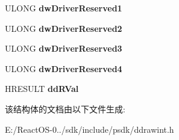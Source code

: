 \begin{DoxyCompactItemize}
\mbox{\label{struct___d_d___s_y_n_c_s_u_r_f_a_c_e_d_a_t_a_ab414a448f28bf179a7cd7fc4d0237489}} 
U\+L\+O\+NG {\bfseries dw\+Driver\+Reserved1}
\item 
\mbox{\label{struct___d_d___s_y_n_c_s_u_r_f_a_c_e_d_a_t_a_a28c36b141b4a9b6bebdc780c5b600995}} 
U\+L\+O\+NG {\bfseries dw\+Driver\+Reserved2}
\item 
\mbox{\label{struct___d_d___s_y_n_c_s_u_r_f_a_c_e_d_a_t_a_a55913f5e05ab443d9d75bbd561cf21d4}} 
U\+L\+O\+NG {\bfseries dw\+Driver\+Reserved3}
\item 
\mbox{\label{struct___d_d___s_y_n_c_s_u_r_f_a_c_e_d_a_t_a_a89f3564d8e7bcb3582c153ee280468b3}} 
U\+L\+O\+NG {\bfseries dw\+Driver\+Reserved4}
\item 
\mbox{\label{struct___d_d___s_y_n_c_s_u_r_f_a_c_e_d_a_t_a_a198a2c21ef61ddf22ea3889b4a2f3044}} 
H\+R\+E\+S\+U\+LT {\bfseries dd\+R\+Val}
\end{DoxyCompactItemize}


该结构体的文档由以下文件生成\+:\begin{DoxyCompactItemize}
\item 
E\+:/\+React\+O\+S-\/0../sdk/include/psdk/ddrawint.\+h\end{DoxyCompactItemize}
